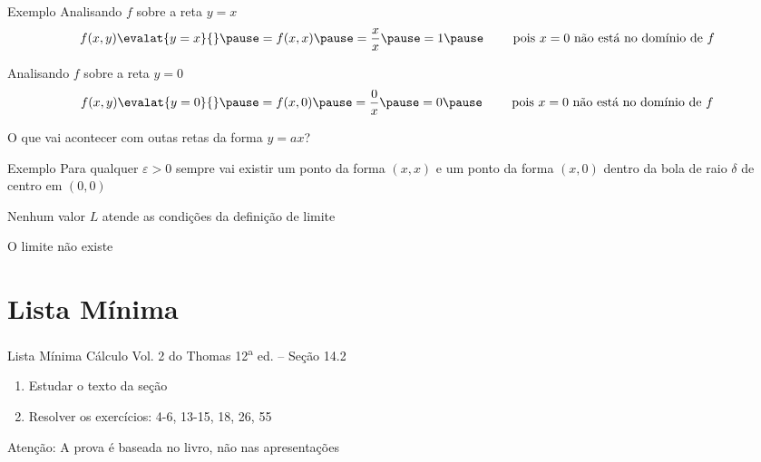 \begin{frame}{Exemplo \theexemplo}
  Analisando $f$ sobre a reta \(y=x\)
  \pause
  \[
    f(x, y) \evalat{y=x}{}
    \pause
    = f(x, x)
    \pause
    = \frac{x}{x}
    \pause
    = 1
    \pause
    \qquad\text{ pois } x=0 \text{ não está no domínio de } f
  \]

  \pause
  Analisando $f$ sobre a reta \(y=0\)
  \pause
  \[
    f(x, y) \evalat{y=0}{}
    \pause
    = f(x, 0)
    \pause
    = \frac{0}{x}
    \pause
    = 0
    \pause
    \qquad\text{ pois } x=0 \text{ não está no domínio de } f
  \]

  \pause
  O que vai acontecer com outas retas da forma \(y=ax\)?
\end{frame}

\begin{frame}{Exemplo \theexemplo}
  Para qualquer $\varepsilon>0$
  \pause
  sempre vai existir um ponto da forma \((x, x)\) e um ponto da forma \((x, 0)\)
  \pause
  dentro da bola de raio $\delta$
  \pause
  de centro em \((0, 0)\)

  \pause
  Nenhum valor $L$ atende as condições da definição de limite

  \pause
  O limite não existe

\end{frame}

\section{Lista Mínima}

\begin{frame}{Lista Mínima}
  Cálculo Vol. 2 do Thomas 12\textsuperscript{a} ed. -- Seção 14.2
  \begin{enumerate}
    \item Estudar o texto da seção
    \item Resolver os exercícios: 4-6, 13-15, 18, 26, 55
  \end{enumerate}
  \vfill
  Atenção: A prova é baseada no livro, não nas apresentações
\end{frame}

\begin{frame}
  \tableofcontents
\end{frame}


